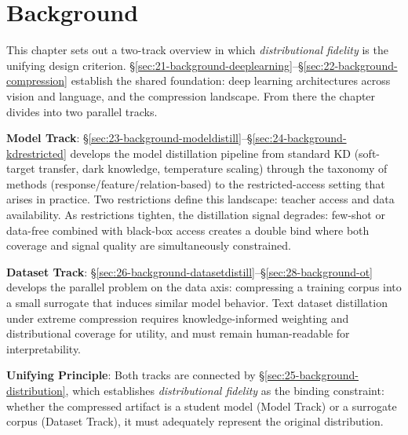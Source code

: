 \acresetall

\chapter{Background} \label{ch:20-background}

\begin{foldable}
  This chapter sets out a two-track overview in which \textit{distributional fidelity} is the unifying design criterion.
  \S\ref{sec:21-background-deeplearning}--\S\ref{sec:22-background-compression} establish the shared foundation: deep learning architectures across vision and language, and the compression landscape.
  From there the chapter divides into two parallel tracks.
\end{foldable}

\begin{foldable}
  \textbf{Model Track}:
  \S\ref{sec:23-background-modeldistill}--\S\ref{sec:24-background-kdrestricted} develops the model distillation pipeline from standard \ac{KD} (soft-target transfer, dark knowledge, temperature scaling) through the taxonomy of methods (response/feature/relation-based) to the restricted-access setting that arises in practice.
  Two restrictions define this landscape: teacher access and data availability.
  As restrictions tighten, the distillation signal degrades: few-shot or data-free combined with black-box access creates a double bind where both coverage and signal quality are simultaneously constrained.
\end{foldable}

\begin{foldable}
  \textbf{Dataset Track}:
  \S\ref{sec:26-background-datasetdistill}--\S\ref{sec:28-background-ot} develops the parallel problem on the data axis: compressing a training corpus into a small surrogate that induces similar model behavior.
  Text dataset distillation under extreme compression requires knowledge-informed weighting and distributional coverage for utility, and must remain human-readable for interpretability.
\end{foldable}

\begin{foldable}
  \textbf{Unifying Principle}:
  Both tracks are connected by \S\ref{sec:25-background-distribution}, which establishes \textit{distributional fidelity} as the binding constraint: whether the compressed artifact is a student model (Model Track) or a surrogate corpus (Dataset Track), it must adequately represent the original distribution.
\end{foldable}

